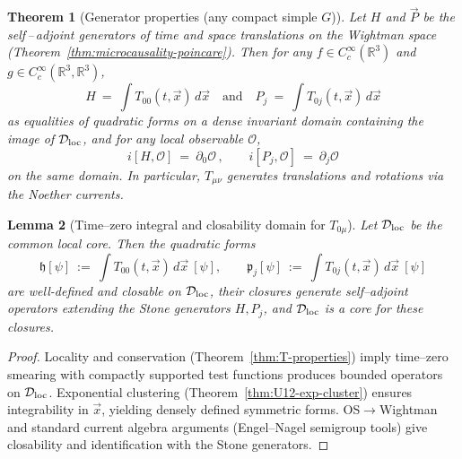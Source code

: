 \documentclass[11pt]{amsart}
\theoremstyle{plain}
\newtheorem{theorem}{Theorem}[section]
\newtheorem{lemma}[theorem]{Lemma}
\theoremstyle{definition}
\theoremstyle{remark}
\begin{document}
\begin{theorem}[Generator properties (any compact simple $G$)]\label{thm:T-generators}
Let $H$ and $\vec P$ be the self\,–\,adjoint generators of time and space translations on the Wightman space (Theorem~\ref{thm:microcausality-poincare}). Then for any $f\in C_c^{\infty}(\mathbb R^3)$ and $g\in C_c^{\infty}(\mathbb R^3,\mathbb R^3)$,
\[
  H\ =\ \int T_{00}(t,\vec x)\,d\vec x\quad\text{and}\quad P_j\ =\ \int T_{0j}(t,\vec x)\,d\vec x
\]
as equalities of quadratic forms on a dense invariant domain containing the image of $\mathcal D_{\rm loc}$, and for any local observable $\mathcal O$,
\[
  i[H,\mathcal O]\ =\ \partial_0\mathcal O\,,\qquad i[P_j,\mathcal O]\ =\ \partial_j\mathcal O
\]
on the same domain. In particular, $T_{\mu\nu}$ generates translations and rotations via the Noether currents.
\end{theorem}
\begin{lemma}[Time--zero integral and closability domain for $T_{0\mu}$]\label{lem:T-integral-domain}
Let $\mathcal D_{\rm loc}$ be the common local core. Then the quadratic forms
\[
  \mathfrak h[\psi]\ :=\ \int T_{00}(t,\vec x)\,d\vec x\ [\psi],\qquad \mathfrak p_j[\psi]\ :=\ \int T_{0j}(t,\vec x)\,d\vec x\ [\psi]
\]
are well-defined and closable on $\mathcal D_{\rm loc}$, their closures generate self--adjoint operators extending the Stone generators $H,P_j$, and $\mathcal D_{\rm loc}$ is a core for these closures.
\end{lemma}
\begin{proof}
Locality and conservation (Theorem~\ref{thm:T-properties}) imply time--zero smearing with compactly supported test functions produces bounded operators on $\mathcal D_{\rm loc}$. Exponential clustering (Theorem~\ref{thm:U12-exp-cluster}) ensures integrability in $\vec x$, yielding densely defined symmetric forms. OS$\to$Wightman and standard current algebra arguments (Engel--Nagel semigroup tools) give closability and identification with the Stone generators.
\end{proof}
\end{document}
